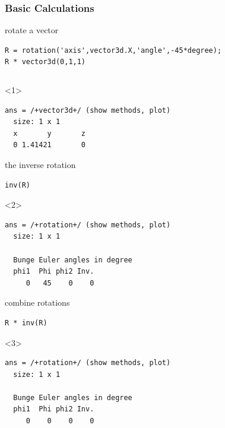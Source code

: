 \documentclass[compress]{beamer}
\begin{document}
\begin{frame}[fragile]
  \frametitle{Basic Calculations}

    rotate a vector
    \begin{lstlisting}[style=input]
R = rotation('axis',vector3d.X,'angle',-45*degree);
R * vector3d(0,1,1)
    \end{lstlisting}

  \begin{columns}
    \begin{column}{8cm}
        \vspace{-0.3cm}
  \begin{overlayarea}{8cm}{8cm}
\begin{onlyenv}<1>

\begin{lstlisting}[style=output]
ans = /+vector3d+/ (show methods, plot)
  size: 1 x 1
  x       y       z
  0 1.41421       0
  \end{lstlisting}
\end{onlyenv}

\pause
 \medskip

 the inverse rotation
 \vspace{-0.2cm}
 \begin{lstlisting}[style=input]
 inv(R)
 \end{lstlisting}
 \begin{onlyenv}<2>
   \vspace{-0.3cm}
  \begin{lstlisting}[style=output]
ans = /+rotation+/ (show methods, plot)
  size: 1 x 1

  Bunge Euler angles in degree
  phi1  Phi phi2 Inv.
     0   45    0    0
  \end{lstlisting}
 \end{onlyenv}

 \pause

 combine rotations
 \vspace{-0.2cm}
 \begin{lstlisting}[style=input]
R * inv(R)
\end{lstlisting}

\begin{onlyenv}<3>
  \vspace{-0.3cm}
  \begin{lstlisting}[style=output]
ans = /+rotation+/ (show methods, plot)
  size: 1 x 1

  Bunge Euler angles in degree
  phi1  Phi phi2 Inv.
     0    0    0    0
  \end{lstlisting}
\end{onlyenv}


\end{overlayarea}
\end{column}
\end{columns}
\end{frame}
\end{document}
